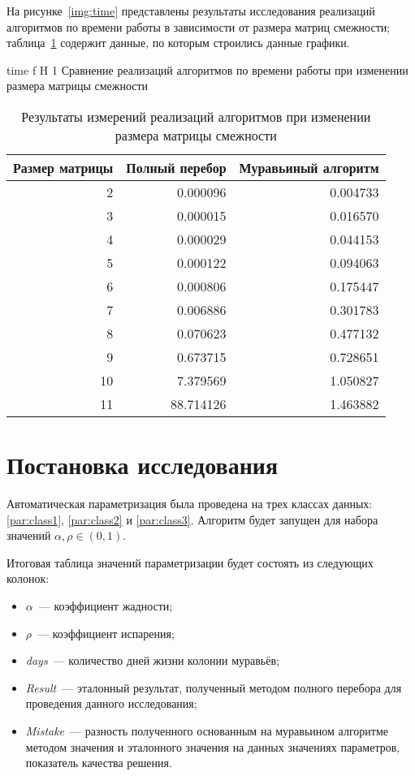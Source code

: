 На рисунке~\ref{img:time} представлены результаты исследования реализаций алгоритмов по времени работы в зависимости от размера матриц смежности; таблица~\ref{tbl:time} содержит данные, по которым строились данные графики.

{time}
{f}
{H}
{1\textwidth}
{Сравнение реализаций алгоритмов по времени работы при изменении размера матрицы смежности}

\begin{table}[H]
	\centering
	\caption{Результаты измерений реализаций алгоритмов при изменении размера матрицы смежности}
	\label{tbl:time}
	\begin{tabular}{|r|r|r|}
		\hline
		\multicolumn{1}{|l|}{Размер матрицы} &
		\multicolumn{1}{l|}{Полный перебор} &
		\multicolumn{1}{l|}{Муравьиный алгоритм} \\ \hline
		2 &   0.000096 &   0.004733 \\ \hline
		3 &   0.000015 &   0.016570 \\ \hline
		4 &   0.000029 &   0.044153 \\ \hline
		5 &   0.000122 &   0.094063 \\ \hline
		6 &   0.000806 &   0.175447 \\ \hline
		7 &   0.006886 &   0.301783 \\ \hline
		8 &   0.070623 &   0.477132 \\ \hline
		9 &   0.673715 &   0.728651 \\ \hline
		10 &   7.379569 &   1.050827 \\ \hline
		11 &  88.714126 &   1.463882 \\ \hline
	\end{tabular}
\end{table}

\section{Постановка исследования}

Автоматическая параметризация была проведена на трех классах данных: \ref{par:class1}, \ref{par:class2} и \ref{par:class3}.
Алгоритм будет запущен для набора значений $\alpha, \rho \in (0, 1)$.

Итоговая таблица значений параметризации будет состоять из следующих колонок:
\begin{itemize}
	\item $\alpha$~--- коэффициент жадности;
	\item $\rho$~--- коэффициент испарения;
	\item \textit{days}~--- количество дней жизни колонии муравьёв;
	\item \textit{Result}~--- эталонный результат, полученный методом полного перебора для проведения данного исследования;
	\item \textit{Mistake}~--- разность полученного основанным на муравьином алгоритме методом значения и эталонного значения на данных значениях параметров, показатель качества решения.
\end{itemize}

